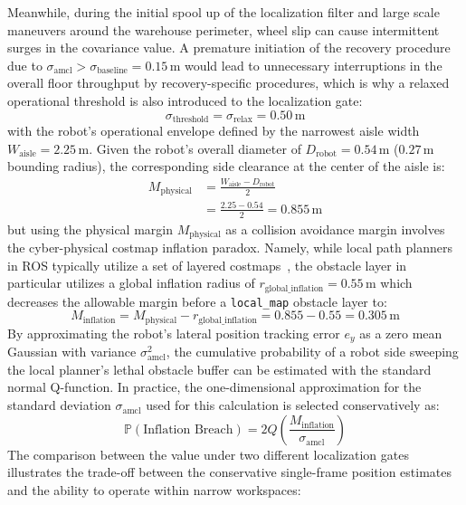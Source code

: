 Meanwhile, during the initial spool up of the localization filter and large scale maneuvers around the warehouse perimeter, wheel slip can cause intermittent surges in the covariance value. A premature initiation of the recovery procedure due to $\sigma_{\text{amcl}} > \sigma_{\text{baseline}} = 0.15\,\text{m}$ would lead to unnecessary interruptions in the overall floor throughput by recovery-specific procedures, which is why a relaxed operational threshold is also introduced to the localization gate:
\begin{equation} \sigma_{\text{threshold}} = \sigma_{\text{relax}} = 0.50\,\text{m} \label{eq:relaxed_uncertainty_threshold} \end{equation}
with the robot's operational envelope defined by the narrowest aisle width $W_{\text{aisle}} = 2.25\,\text{m}$. Given the robot's overall diameter of $D_{\text{robot}} = 0.54\,\text{m}$ ($0.27\,\text{m}$ bounding radius), the corresponding side clearance at the center of the aisle is:
\begin{equation}
\begin{aligned}
M_{\text{physical}} &= \frac{W_{\text{aisle}} - D_{\text{robot}}}{2} \\
&= \frac{2.25 - 0.54}{2} = 0.855\,\text{m}
\end{aligned}
\label{eq:physical_clearance_margin}
\end{equation}
but using the physical margin $M_{\text{physical}}$ as a collision avoidance margin involves the cyber-physical costmap inflation paradox. Namely, while local path planners in ROS typically utilize a set of layered costmaps~\cite{lu2014layered}, the obstacle layer in particular utilizes a global inflation radius of $r_{\text{global\_inflation}} = 0.55\,\text{m}$ which decreases the allowable margin before a \texttt{local\_map} obstacle layer to:
\begin{equation} M_{\text{inflation}} = M_{\text{physical}} - r_{\text{global\_inflation}} = 0.855 - 0.55 = 0.305\,\text{m} \label{eq:cyber_physical_margin} \end{equation}
By approximating the robot's lateral position tracking error $e_y$ as a zero mean Gaussian with variance $\sigma^2_{\text{amcl}}$, the cumulative probability of a robot side sweeping the local planner's lethal obstacle buffer can be estimated with the standard normal Q-function. In practice, the one-dimensional approximation for the standard deviation $\sigma_{\text{amcl}}$ used for this calculation is selected conservatively as:
\begin{equation} \mathbb{P}(\text{Inflation Breach}) = 2 Q\left( \frac{M_{\text{inflation}}}{\sigma_{\text{amcl}}} \right) \label{eq:collision_probability_q_function} \end{equation}
The comparison between the value under two different localization gates illustrates the trade-off between the conservative single-frame position estimates and the ability to operate within narrow workspaces:


